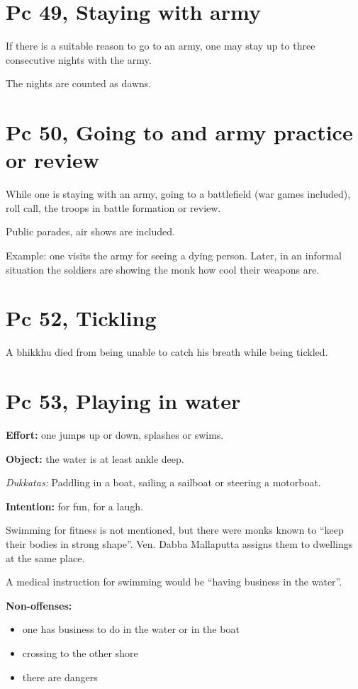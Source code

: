 \section{Pc 49, Staying with army}

If there is a suitable reason to go to an army, one may stay up to three
consecutive nights with the army.

The nights are counted as dawns.

\section{Pc 50, Going to and army practice or review}

While one is staying with an army, going to a battlefield (war games
included), roll call, the troops in battle formation or review.

Public parades, air shows are included.

Example: one visits the army for seeing a dying person. Later, in an
informal situation the soldiers are showing the monk how cool their
weapons are.

\section{Pc 52, Tickling}

A bhikkhu died from being unable to catch his breath while being
tickled.

\section{Pc 53, Playing in water}

\begin{multicols}{2}

\textbf{Effort:} one jumps up or down, splashes or swims.

\textbf{Object:} the water is at least ankle deep.

\emph{Dukkatas:} Paddling in a boat, sailing a sailboat or steering a
motorboat.

\textbf{Intention:} for fun, for a laugh.

Swimming for fitness is not mentioned, but there were monks known to
``keep their bodies in strong shape''. Ven. Dabba Mallaputta assigns
them to dwellings at the same place.

A medical instruction for swimming would be ``having business in the
water''.

\textbf{Non-offenses:}

\begin{itemize}
\tightlist
\item
  one has business to do in the water or in the boat
\item
  crossing to the other shore
\item
  there are dangers
\end{itemize}

\end{multicols}


